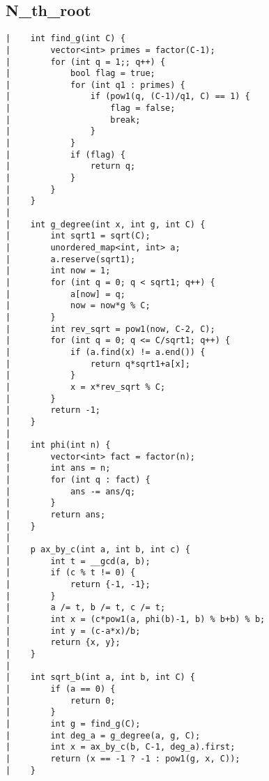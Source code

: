 \documentclass[a4paper, 10pt]{article}
\begin{document}
\begin{center}
\section*{N\_th\_root}
\begin{verbatim}
|    int find_g(int C) {
|        vector<int> primes = factor(C-1);
|        for (int q = 1;; q++) {
|            bool flag = true;
|            for (int q1 : primes) {
|                if (pow1(q, (C-1)/q1, C) == 1) {
|                    flag = false;
|                    break;
|                }
|            }
|            if (flag) {
|                return q;
|            }
|        }
|    }
|    
|    int g_degree(int x, int g, int C) {
|        int sqrt1 = sqrt(C);
|        unordered_map<int, int> a;
|        a.reserve(sqrt1);
|        int now = 1;
|        for (int q = 0; q < sqrt1; q++) {
|            a[now] = q;
|            now = now*g % C;
|        }
|        int rev_sqrt = pow1(now, C-2, C);
|        for (int q = 0; q <= C/sqrt1; q++) {
|            if (a.find(x) != a.end()) {
|                return q*sqrt1+a[x];
|            }
|            x = x*rev_sqrt % C;
|        }
|        return -1;
|    }
|    
|    int phi(int n) {
|        vector<int> fact = factor(n);
|        int ans = n;
|        for (int q : fact) {
|            ans -= ans/q;
|        }
|        return ans;
|    }
|    
|    p ax_by_c(int a, int b, int c) {
|        int t = __gcd(a, b);
|        if (c % t != 0) {
|            return {-1, -1};
|        }
|        a /= t, b /= t, c /= t;
|        int x = (c*pow1(a, phi(b)-1, b) % b+b) % b;
|        int y = (c-a*x)/b;
|        return {x, y};
|    }
|    
|    int sqrt_b(int a, int b, int C) {
|        if (a == 0) {
|            return 0;
|        }
|        int g = find_g(C);
|        int deg_a = g_degree(a, g, C);
|        int x = ax_by_c(b, C-1, deg_a).first;
|        return (x == -1 ? -1 : pow1(g, x, C));
|    }
\end{verbatim}


\end{center}
\end{document}
